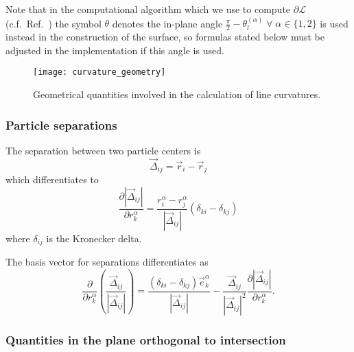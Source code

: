 Note that in the computational algorithm which we use to compute $\partial\mathcal{L}$ (c.f.\ Ref.\ \cite{Klenin2011}) the symbol $\theta$ denotes the in-plane angle $\frac{\pi}{2} - \theta_l^{(\alpha)} \; \forall \; \alpha \in \{1,2\}$ is used instead in the construction of the surface, so formulas stated below must be adjusted in the implementation if this angle is used.

\begin{figure}[b]
  \centering
  \texttt{[image: curvature\_geometry]}
  \caption{Geometrical quantities involved in the calculation of line curvatures.}
  \label{fig:curvature-geometry}
\end{figure}

\subsubsection{Particle separations}

The separation between two particle centers is
\begin{equation}
  \vec{\Delta}_{ij} = \vec{r}_i - \vec{r}_j
\end{equation}
which differentiates to
\begin{equation}
  \frac{\partial |\vec{\Delta}_{ij}|}{\partial r_k^\alpha} =
  \frac{r_i^\alpha - r_j^\alpha}{|\vec{\Delta}_{ij}|} (\delta_{ki} - \delta_{kj})
\end{equation}
where $\delta_{ij}$ is the Kronecker delta.

The basis vector for separations differentiates as
\begin{equation}
  \frac{\partial}{\partial r_k^\alpha}
  \left( \frac{\vec{\Delta}_{ij}}{|\vec{\Delta}_{ij}|} \right) =
  \frac{(\delta_{ki} - \delta_{kj}) \vec{e}_k^\alpha}{|\vec{\Delta}_{ij}|}
  - \frac{\vec{\Delta}_{ij}}{|\vec{\Delta}_{ij}|^2}
  \frac{\partial |\vec{\Delta}_{ij}|}{\partial r_k^\alpha}.
\end{equation}

\subsubsection{Quantities in the plane orthogonal to intersection}

